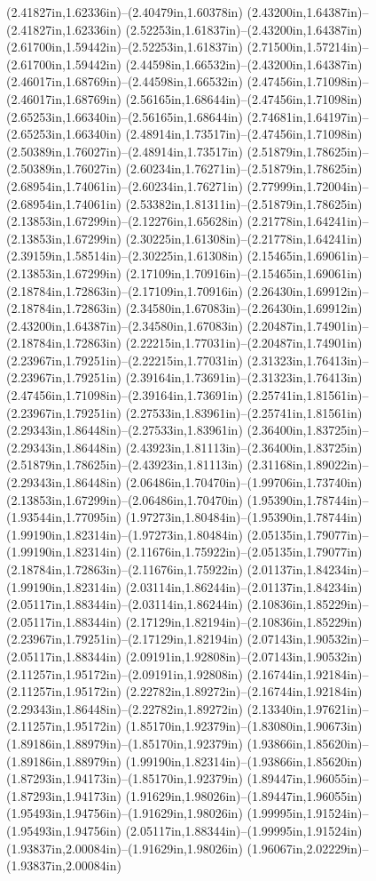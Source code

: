 (2.41827in,1.62336in)--(2.40479in,1.60378in) (2.43200in,1.64387in)--(2.41827in,1.62336in) (2.52253in,1.61837in)--(2.43200in,1.64387in) (2.61700in,1.59442in)--(2.52253in,1.61837in) (2.71500in,1.57214in)--(2.61700in,1.59442in) (2.44598in,1.66532in)--(2.43200in,1.64387in) (2.46017in,1.68769in)--(2.44598in,1.66532in) (2.47456in,1.71098in)--(2.46017in,1.68769in) (2.56165in,1.68644in)--(2.47456in,1.71098in) (2.65253in,1.66340in)--(2.56165in,1.68644in) (2.74681in,1.64197in)--(2.65253in,1.66340in) (2.48914in,1.73517in)--(2.47456in,1.71098in) (2.50389in,1.76027in)--(2.48914in,1.73517in) (2.51879in,1.78625in)--(2.50389in,1.76027in) (2.60234in,1.76271in)--(2.51879in,1.78625in) (2.68954in,1.74061in)--(2.60234in,1.76271in) (2.77999in,1.72004in)--(2.68954in,1.74061in) (2.53382in,1.81311in)--(2.51879in,1.78625in) (2.13853in,1.67299in)--(2.12276in,1.65628in) (2.21778in,1.64241in)--(2.13853in,1.67299in) (2.30225in,1.61308in)--(2.21778in,1.64241in) (2.39159in,1.58514in)--(2.30225in,1.61308in) (2.15465in,1.69061in)--(2.13853in,1.67299in) (2.17109in,1.70916in)--(2.15465in,1.69061in) (2.18784in,1.72863in)--(2.17109in,1.70916in) (2.26430in,1.69912in)--(2.18784in,1.72863in) (2.34580in,1.67083in)--(2.26430in,1.69912in) (2.43200in,1.64387in)--(2.34580in,1.67083in) (2.20487in,1.74901in)--(2.18784in,1.72863in) (2.22215in,1.77031in)--(2.20487in,1.74901in) (2.23967in,1.79251in)--(2.22215in,1.77031in) (2.31323in,1.76413in)--(2.23967in,1.79251in) (2.39164in,1.73691in)--(2.31323in,1.76413in) (2.47456in,1.71098in)--(2.39164in,1.73691in) (2.25741in,1.81561in)--(2.23967in,1.79251in) (2.27533in,1.83961in)--(2.25741in,1.81561in) (2.29343in,1.86448in)--(2.27533in,1.83961in) (2.36400in,1.83725in)--(2.29343in,1.86448in) (2.43923in,1.81113in)--(2.36400in,1.83725in) (2.51879in,1.78625in)--(2.43923in,1.81113in) (2.31168in,1.89022in)--(2.29343in,1.86448in) (2.06486in,1.70470in)--(1.99706in,1.73740in) (2.13853in,1.67299in)--(2.06486in,1.70470in) (1.95390in,1.78744in)--(1.93544in,1.77095in) (1.97273in,1.80484in)--(1.95390in,1.78744in) (1.99190in,1.82314in)--(1.97273in,1.80484in) (2.05135in,1.79077in)--(1.99190in,1.82314in) (2.11676in,1.75922in)--(2.05135in,1.79077in) (2.18784in,1.72863in)--(2.11676in,1.75922in) (2.01137in,1.84234in)--(1.99190in,1.82314in) (2.03114in,1.86244in)--(2.01137in,1.84234in) (2.05117in,1.88344in)--(2.03114in,1.86244in) (2.10836in,1.85229in)--(2.05117in,1.88344in) (2.17129in,1.82194in)--(2.10836in,1.85229in) (2.23967in,1.79251in)--(2.17129in,1.82194in) (2.07143in,1.90532in)--(2.05117in,1.88344in) (2.09191in,1.92808in)--(2.07143in,1.90532in) (2.11257in,1.95172in)--(2.09191in,1.92808in) (2.16744in,1.92184in)--(2.11257in,1.95172in) (2.22782in,1.89272in)--(2.16744in,1.92184in) (2.29343in,1.86448in)--(2.22782in,1.89272in) (2.13340in,1.97621in)--(2.11257in,1.95172in) (1.85170in,1.92379in)--(1.83080in,1.90673in) (1.89186in,1.88979in)--(1.85170in,1.92379in) (1.93866in,1.85620in)--(1.89186in,1.88979in) (1.99190in,1.82314in)--(1.93866in,1.85620in) (1.87293in,1.94173in)--(1.85170in,1.92379in) (1.89447in,1.96055in)--(1.87293in,1.94173in) (1.91629in,1.98026in)--(1.89447in,1.96055in) (1.95493in,1.94756in)--(1.91629in,1.98026in) (1.99995in,1.91524in)--(1.95493in,1.94756in) (2.05117in,1.88344in)--(1.99995in,1.91524in) (1.93837in,2.00084in)--(1.91629in,1.98026in) (1.96067in,2.02229in)--(1.93837in,2.00084in) 